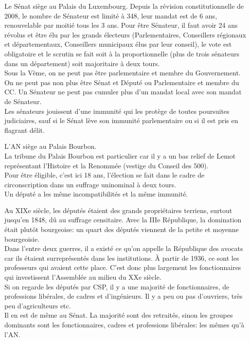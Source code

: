 \documentclass[12pt, a4paper, openany]{book}
\begin{document}
Le Sénat siège au Palais du Luxembourg. Depuis la révision constitutionnelle de 2008, le nombre de Sénateur est limité à 348, leur mandat est de 6 ans, renouvelable par moitié tous les 3 ans. Pour être Sénateur, il faut avoir 24 ans révolus et être élu par les grands électeurs (Parlementaires, Conseillers régionaux et départementaux, Conseillers municipaux élus par leur conseil), le vote est obligatoire et le scrutin se fait soit à la proportionnelle (plus de trois sénateurs dans un département) soit majoritaire à deux tours. \\
Sous la Vème, on ne peut pas être parlementaire et membre du Gouvernement. On ne peut pas non plus être Sénat et Député ou Parlementaire et membre du CC. Un Sénateur ne peut pas cumuler plus d'un mandat local avec son mandat de Sénateur. \\
Les sénateurs jouissent d'une immunité qui les protège de toutes poursuites judiciaires, sauf si le Sénat lève son immunité parlementaire ou si il est pris en flagrant délit.


L'AN siège au Palais Bourbon. \\
La tribune du Palais Bourbon est particulier car il y a un bas relief de Lemot représentant l'Histoire et la Renommée (vestige du Conseil des 500). \\
Pour être éligible, c'est ici 18 ans, l'élection se fait dans le cadre de circonscription dans un suffrage uninominal à deux tours. \\
Un député a les même incompatibilités et la même immunité. 


Au XIXe siècle, les députés étaient des grands propriétaires terriens, surtout jusqu'en 1848, dû au suffrage censitaire. Avec la IIIe République, la domination était plutôt bourgeoise: un quart des députés viennent de la petite et moyenne bourgeoisie. \\
Dans l'entre deux guerres, il a existé ce qu'on appelle la République des avocats car ils étaient surreprésentés dans les institutions. À partir de 1936, ce sont les professeurs qui avaient cette place. C'est donc plus largement les fonctionnaires qui investissent l'Assemblée au milieu du XXe siècle. \\
Si on regarde les députés par CSP, il y a une majorité de fonctionnaires, de professions libérales, de cadres et d'ingénieurs. Il y a peu ou pas d'ouvriers, très peu d'agriculteurs etc. \\
Il en est de même au Sénat. La majorité sont des retraités, sinon les groupes dominants sont les fonctionnaires, cadres et professions libérales: les mêmes qu'à l'AN.
\end{document}
